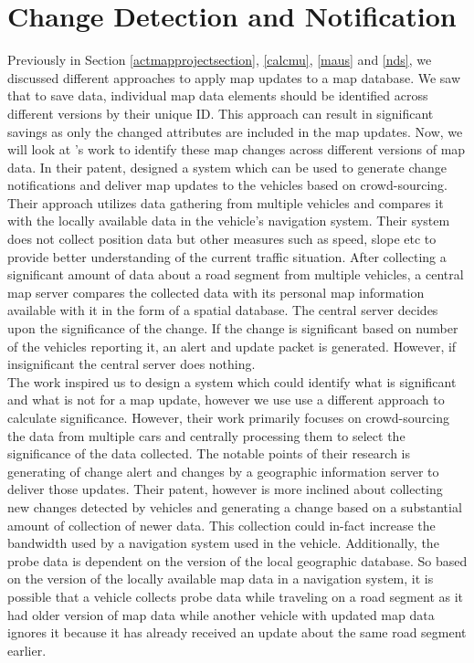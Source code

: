 \section{Change Detection and Notification}
Previously in Section \ref{actmapprojectsection}, \ref{calcmu}, \ref{maus} and \ref{nds}, we discussed different approaches to apply map updates to a map database. We saw that to save data, individual map data elements should be identified across different versions by their unique ID. This approach can result in significant savings as only the changed attributes are included in the map updates. Now, we will look at \citet{zavoli2008method}'s work to identify these map changes across different versions of map data. In their patent, \citet{zavoli2008method} designed a system which can be used to generate change notifications and deliver map updates to the vehicles based on crowd-sourcing. Their approach utilizes data gathering from multiple vehicles and compares it with the locally available data in the vehicle's navigation system. Their system does not collect position data but other measures such as speed, slope etc to provide better understanding of the current traffic situation. After collecting a significant amount of data about a road segment from multiple vehicles, a central map server compares the collected data with its personal map information available with it in the form of a spatial database. The central server decides upon the significance of the change. If the change is significant based on number of the vehicles reporting it, an alert and update packet is generated. However, if insignificant the central server does nothing. \\

The work inspired us to design a system which could identify what is significant and what is not for a map update, however we use use a different approach to calculate significance. However, their work primarily focuses on crowd-sourcing the data from multiple cars and centrally processing them to select the significance of the data collected. The notable points of their research is generating of change alert and changes by a geographic information server to deliver those updates. Their patent, however is more inclined about collecting new changes detected by vehicles and generating a change based on a substantial amount of collection of newer data. This collection could in-fact increase the bandwidth used by a navigation system used in the vehicle. Additionally, the probe data is dependent on the version of the local geographic database. So based on the version of the locally available map data in a navigation system, it is possible that a vehicle collects probe data while traveling on a road segment as it had older version of map data while another vehicle with updated map data ignores it because it has already received an update about the same road segment earlier.

